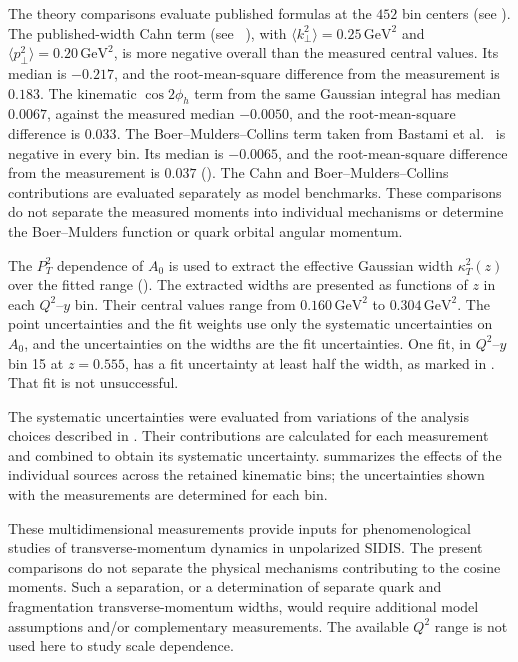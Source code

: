 The theory comparisons evaluate published formulas at the $452$ bin centers (see ). The published-width Cahn term (see ~\cite{Anselmino:2005nn,Barone:2015cgh}), with $\langle k_{\perp}^{2}\rangle = 0.25\,\mathrm{GeV}^{2}$ and $\langle p_{\perp}^{2}\rangle = 0.20\,\mathrm{GeV}^{2}$, is more negative overall than the measured central values. Its median is $-0.217$, and the root-mean-square difference from the measurement is $0.183$. The kinematic $\cos 2\phi_h$ term from the same Gaussian integral has median $0.0067$, against the measured median $-0.0050$, and the root-mean-square difference is $0.033$. The Boer--Mulders--Collins term taken from Bastami et al.~\cite{Bastami:2018xqd} is negative in every bin. Its median is $-0.0065$, and the root-mean-square difference from the measurement is $0.037$ (). The Cahn and Boer--Mulders--Collins contributions are evaluated separately as model benchmarks. These comparisons do not separate the measured moments into individual mechanisms or determine the Boer--Mulders function or quark orbital angular momentum.

The $P_T^{2}$ dependence of $A_{0}$ is used to extract the effective Gaussian width $\kappa_T^{2}(z)$ over the fitted range (). The extracted widths are presented as functions of $z$ in each $Q^{2}$--$y$ bin. Their central values range from $0.160\,\mathrm{GeV}^{2}$ to $0.304\,\mathrm{GeV}^{2}$. The point uncertainties and the fit weights use only the systematic uncertainties on $A_{0}$, and the uncertainties on the widths are the fit uncertainties. One fit, in $Q^{2}$--$y$ bin 15 at $z=0.555$, has a fit uncertainty at least half the width, as marked in . That fit is not unsuccessful.

The systematic uncertainties were evaluated from variations of the analysis choices described in . Their contributions are calculated for each measurement and combined to obtain its systematic uncertainty.  summarizes the effects of the individual sources across the retained kinematic bins; the uncertainties shown with the measurements are determined for each bin.

These multidimensional measurements provide inputs for phenomenological studies of transverse-momentum dynamics in unpolarized SIDIS. The present comparisons do not separate the physical mechanisms contributing to the cosine moments. Such a separation, or a determination of separate quark and fragmentation transverse-momentum widths, would require additional model assumptions and/or complementary measurements. The available $Q^2$ range is not used here to study scale dependence.
